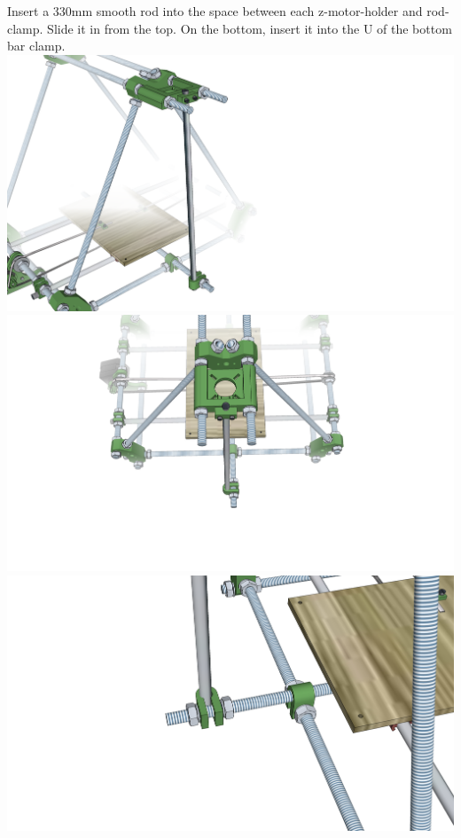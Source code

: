 \documentclass[twoside,a4paper,titlepage]{memoir}
\begin{document}
	\section{}
	Insert a 330mm smooth rod into the space between each z-motor-holder and rod-clamp. Slide it in from
	the top. On the bottom, insert it into the U of the bottom bar clamp.\\
	\includegraphics[width=1\linewidth]{graphics/ch8_6_1.png}
	\includegraphics[width=1\linewidth]{graphics/ch8_6_2.png}
	\includegraphics[width=1\linewidth]{graphics/ch8_6_3.png}
	
\end{document}
